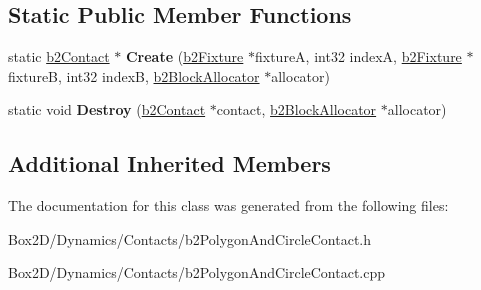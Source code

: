 \subsection*{Static Public Member Functions}
\begin{DoxyCompactItemize}
\item 
\mbox{\label{classb2_polygon_and_circle_contact_a0b83e092a7d14f9cdd919fa15ef6058f}} 
static \hyperlink{classb2_contact}{b2\+Contact} $\ast$ {\bfseries Create} (\hyperlink{classb2_fixture}{b2\+Fixture} $\ast$fixtureA, int32 indexA, \hyperlink{classb2_fixture}{b2\+Fixture} $\ast$fixtureB, int32 indexB, \hyperlink{classb2_block_allocator}{b2\+Block\+Allocator} $\ast$allocator)
\item 
\mbox{\label{classb2_polygon_and_circle_contact_a04e9a3fcdcf52821fb90b8206b8bb2f0}} 
static void {\bfseries Destroy} (\hyperlink{classb2_contact}{b2\+Contact} $\ast$contact, \hyperlink{classb2_block_allocator}{b2\+Block\+Allocator} $\ast$allocator)
\end{DoxyCompactItemize}
\subsection*{Additional Inherited Members}


The documentation for this class was generated from the following files\+:\begin{DoxyCompactItemize}
\item 
Box2\+D/\+Dynamics/\+Contacts/b2\+Polygon\+And\+Circle\+Contact.\+h\item 
Box2\+D/\+Dynamics/\+Contacts/b2\+Polygon\+And\+Circle\+Contact.\+cpp\end{DoxyCompactItemize}
